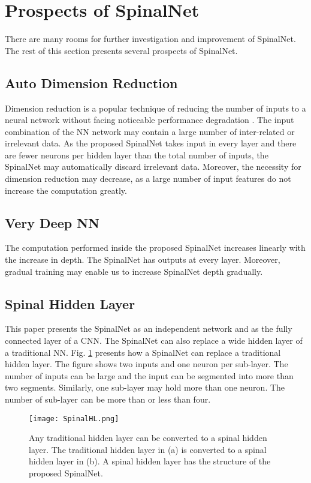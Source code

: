 \documentclass[journal]{IEEEtran}
\begin{document}
\section{Prospects of SpinalNet}
There are many rooms for further investigation and improvement of SpinalNet. The rest of this section presents several prospects of SpinalNet.

\subsection{Auto Dimension Reduction}
Dimension reduction is a popular technique of reducing the number of inputs to a neural network without facing noticeable performance degradation \cite{vohra2019active}. The input combination of the NN network may contain a large number of inter-related or irrelevant data. As the proposed SpinalNet takes input in every layer and there are fewer neurons per hidden layer than the total number of inputs, the SpinalNet may automatically discard irrelevant data. Moreover, the necessity for dimension reduction may decrease, as a large number of input features do not increase the computation greatly.    




\subsection{Very Deep NN}
The computation performed inside the proposed SpinalNet increases linearly with the increase in depth. The SpinalNet has outputs at every layer. Moreover, gradual training may enable us to increase SpinalNet depth gradually. 



\subsection{Spinal Hidden Layer}
This paper presents the SpinalNet as an independent network and as the fully connected layer of a CNN. The SpinalNet can also replace a wide hidden layer of a traditional NN. Fig. \ref{SpinalHL} presents how a SpinalNet can replace a traditional hidden layer. The figure shows two inputs and one neuron per sub-layer. The number of inputs can be large and the input can be segmented into more than two segments. Similarly, one sub-layer may hold more than one neuron.  The number of sub-layer can be more than or less than four.  

\begin{figure}
  \centering
  \texttt{[image: SpinalHL.png]}
  \caption{Any traditional hidden layer can be converted to a spinal hidden layer. The traditional hidden layer in (a) is converted to a spinal hidden layer in (b). A spinal hidden layer has the structure of the proposed SpinalNet.}
  \label{SpinalHL}
\end{figure}
\end{document}
